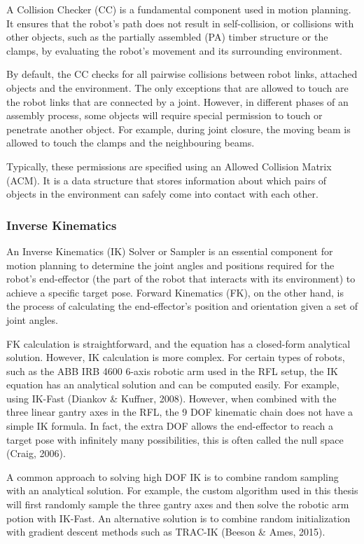 A Collision Checker (CC) is a fundamental component used in motion planning. It ensures that the robot's path does not result in self-collision, or collisions with other objects, such as the partially assembled (PA) timber structure or the clamps, by evaluating the robot's movement and its surrounding environment. 

By default, the CC checks for all pairwise collisions between robot links, attached objects and the environment. The only exceptions that are allowed to touch are the robot links that are connected by a joint. However, in different phases of an assembly process, some objects will require special permission to touch or penetrate another object. For example, during joint closure, the moving beam is allowed to touch the clamps and the neighbouring beams. 

Typically, these permissions are specified using an Allowed Collision Matrix (ACM). It is a data structure that stores information about which pairs of objects in the environment can safely come into contact with each other.

\subsubsection{Inverse Kinematics}

An Inverse Kinematics (IK) Solver or Sampler is an essential component for motion planning to determine the joint angles and positions required for the robot's end-effector (the part of the robot that interacts with its environment) to achieve a specific target pose. Forward Kinematics (FK), on the other hand, is the process of calculating the end-effector's position and orientation given a set of joint angles.

FK calculation is straightforward, and the equation has a closed-form analytical solution. However, IK calculation is more complex. For certain types of robots, such as the ABB IRB 4600 6-axis robotic arm used in the RFL setup, the IK equation has an analytical solution and can be computed easily. For example, using IK-Fast (Diankov & Kuffner, 2008). However, when combined with the three linear gantry axes in the RFL, the 9 DOF kinematic chain does not have a simple IK formula. In fact, the extra DOF allows the end-effector to reach a target pose with infinitely many possibilities, this is often called the null space (Craig, 2006).

A common approach to solving high DOF IK is to combine random sampling with an analytical solution. For example, the custom algorithm used in this thesis will first randomly sample the three gantry axes and then solve the robotic arm potion with IK-Fast. An alternative solution is to combine random initialization with gradient descent methods such as TRAC-IK (Beeson & Ames, 2015). 

